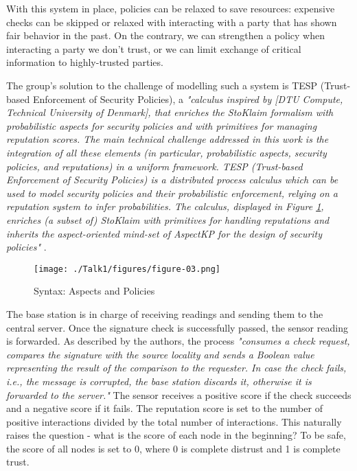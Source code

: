 \documentclass[12pt,a4paper,twoside]{report}
\begin{document}
With this system in place, policies can be relaxed to save resources: expensive checks can be skipped or relaxed with interacting with a party that has shown fair behavior in the past. On the contrary, we can strengthen a policy when interacting a party we don't trust, or we can limit exchange of critical information to highly-trusted parties. \par
The group's solution to the challenge of modelling such a system is TESP (Trust-based Enforcement of Security Policies), a \emph{"calculus inspired by [DTU Compute, Technical University of Denmark], that enriches the StoKlaim formalism with probabilistic aspects for security policies and with primitives for managing reputation scores. The main technical challenge addressed in this work is the integration of all these elements (in particular, probabilistic aspects, security policies, and reputations) in a uniform framework. TESP (Trust-based Enforcement of Security Policies) is a distributed process calculus which can be used to model security policies and their probabilistic enforcement, relying on a reputation system to infer probabilities. The calculus, displayed in Figure \ref{fig:03}, enriches (a subset of) StoKlaim with primitives for handling reputations and inherits the aspect-oriented mind-set of AspectKP for the design of security policies"} \cite{vigo;etal:2014}.\par
\begin{figure}[ht]
	\begin{center}
  \texttt{[image: ./Talk1/figures/figure-03.png]}
  \end{center}
  \caption{Syntax: Aspects and Policies \cite{vigo;etal:2014}}
  \label{fig:03}
\end{figure}
The base station is in charge of receiving readings and sending them to the central server. Once the signature check is successfully passed, the sensor reading is forwarded. As described by the authors, the process \emph{"consumes a check request, compares the signature with the source locality and sends a Boolean value representing the result of the comparison to the requester. In case the check fails, i.e., the message is corrupted, the base station discards it, otherwise it is forwarded to the server."} The sensor receives a positive score if the check succeeds and a negative score if it fails. The reputation score is set to the number of positive interactions divided by the total number of interactions. This naturally raises the question - what is the score of each node in the beginning? To be safe, the score of all nodes is set to 0, where 0 is complete distrust and 1 is complete trust. \par
\end{document}
